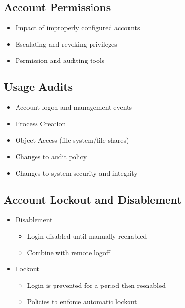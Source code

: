 	\subsection {Account Permissions}
		\begin{itemize}
			\item Impact of improperly configured accounts
			\item Escalating and revoking privileges
			\item Permission and auditing tools
		\end{itemize}
	\subsection {Usage Audits}
		\begin{itemize}
			\item Account logon and management events
			\item Process Creation
			\item Object Access (file system/file shares)
			\item Changes to audit policy
			\item Changes to system security and integrity
		\end{itemize}
	\subsection {Account Lockout and Disablement}
		\begin{itemize}
			\item Disablement
				\begin{itemize}
					\item Login disabled until manually reenabled
					\item Combine with remote logoff
				\end{itemize}
			\item Lockout
				\begin{itemize}
					\item Login is prevented for a period then reenabled
					\item Policies to enforce automatic lockout
				\end{itemize}
		\end{itemize}
